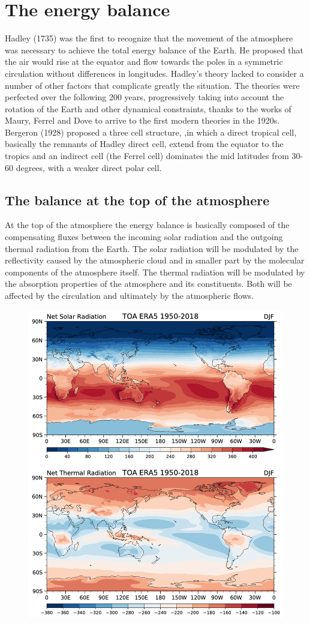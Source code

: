 \section{The energy balance}\label{chp:Theux20energyux20balance}

Hadley (1735) was the first to recognize that the movement of the
atmosphere was necessary to achieve the total energy balance of the
Earth. He proposed that the air would rise at the equator and flow
towards the poles in a symmetric circulation without differences in
longitudes. Hadley's theory lacked to consider a number of other factors
that complicate greatly the situation. The theories were perfected over
the following 200 years, progressively taking into account the rotation
of the Earth and other dynamical constraints, thanks to the works of
Maury, Ferrel and Dove to arrive to the first modern theories in the
1920s. Bergeron (1928) proposed a three cell structure, ,in which a
direct tropical cell, basically the remnants of Hadley direct cell,
extend from the equator to the tropics and an indirect cell (the Ferrel
cell) dominates the mid latitudes from 30-60 degrees, with a weaker
direct polar cell.

\subsection{The balance at the top of the
atmosphere}\label{the-balance-at-the-top-of-the-atmosphere}

At the top of the atmosphere the energy balance is basically composed of
the compensating fluxes between the incoming solar radiation and the
outgoing thermal radiation from the Earth. The solar radiation will be
modulated by the reflectivity caused by the atmospheric cloud and in
smaller part by the molecular components of the atmosphere itself. The
thermal radiation will be modulated by the absorption properties of the
atmosphere and its constituents. Both will be affected by the
circulation and ultimately by the atmospheric flows.

\begin{figure}
\centering
\includegraphics[width = .7 \textwidth]{figs/GD/TOADJF.png}
\caption{} \label{fig:}
\end{figure}

